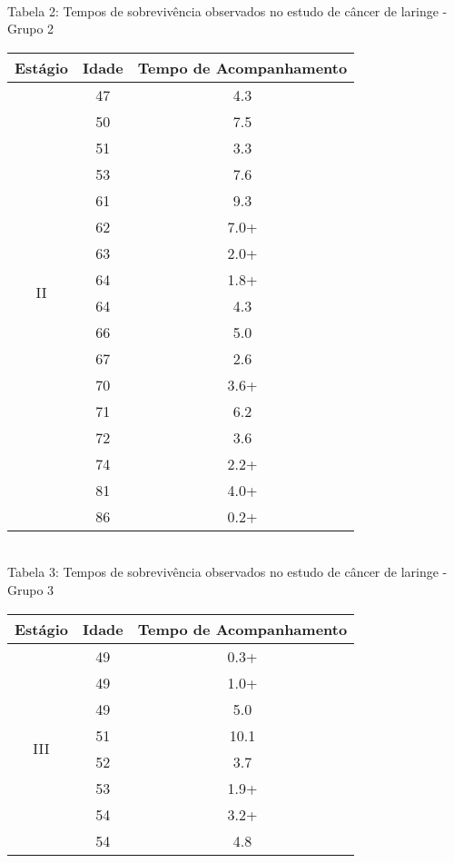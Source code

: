 \documentclass[12pt,a4paper]{article}
\begin{document}
\begin{center}
\begin{tabular}{|c|c|c|}
		\end{tabular}
		\vspace{1cm}\\
		\small{Tabela 2: Tempos de sobrevivência observados no estudo de câncer de laringe  - Grupo 2}
		\begin{tabular}{|c|c|c|}\hline
			\textbf{Estágio} & \textbf{Idade} & \textbf{Tempo de Acompanhamento}\\ \hline
			\multirow{16}{*}{II} & 47 & 4.3\\ \cline{2-3}
			& 50 & 7.5\\ \cline{2-3}
			& 51 & 3.3\\ \cline{2-3}
			& 53 & 7.6\\ \cline{2-3}
			& 61 & 9.3\\ \cline{2-3}
			& 62 & 7.0+\\ \cline{2-3}
			& 63 & 2.0+\\ \cline{2-3}
			& 64 & 1.8+\\ \cline{2-3}
			& 64 & 4.3\\ \cline{2-3}
			& 66 & 5.0\\ \cline{2-3}
			& 67 & 2.6\\ \cline{2-3}
			& 70 & 3.6+\\ \cline{2-3}
			& 71 & 6.2\\ \cline{2-3}
			& 72 & 3.6\\ \cline{2-3}
			& 74 & 2.2+\\ \cline{2-3}
			& 81 & 4.0+\\ \cline{2-3}
			& 86 & 0.2+\\ \hline
		\end{tabular}
		\vspace{1cm}\\
		\small{Tabela 3: Tempos de sobrevivência observados no estudo de câncer de laringe  - Grupo 3}
		\begin{tabular}{|c|c|c|}\hline
			\textbf{Estágio} & \textbf{Idade} & \textbf{Tempo de Acompanhamento}\\ \hline
			\multirow{27}{*}{III} & 49 & 0.3+\\ \cline{2-3}
			& 49 & 1.0+\\ \cline{2-3}
			& 49 & 5.0\\ \cline{2-3}
			& 51 & 10.1\\ \cline{2-3}
			& 52 & 3.7\\ \cline{2-3}
			& 53 & 1.9+\\ \cline{2-3}
			& 54 & 3.2+\\ \cline{2-3}
			& 54 & 4.8\\ \cline{2-3}

\end{tabular}
\end{center}
\end{document}
